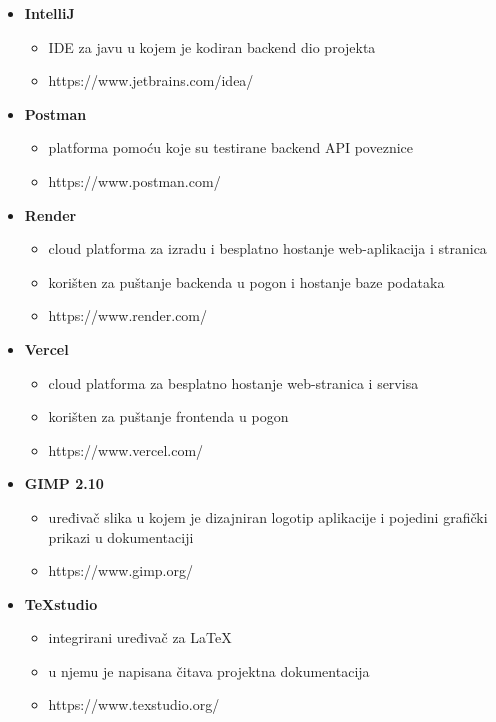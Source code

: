 \begin{itemize}
				\item \textbf{IntelliJ}
				\begin{itemize}
					\item IDE za javu u kojem je kodiran backend dio projekta
					\item https://www.jetbrains.com/idea/
				\end{itemize}
			
				\item \textbf{Postman}
				\begin{itemize}
					\item platforma pomoću koje su testirane backend API poveznice
					\item https://www.postman.com/
				\end{itemize}
			
				\item \textbf{Render}
				\begin{itemize}
					\item cloud platforma za izradu i besplatno hostanje web-aplikacija i stranica
					\item korišten za puštanje backenda u pogon i hostanje baze podataka
					\item https://www.render.com/
				\end{itemize}
				
				\item \textbf{Vercel}
				\begin{itemize}
					\item cloud platforma za besplatno hostanje web-stranica i servisa
					\item korišten za puštanje frontenda u pogon
					\item https://www.vercel.com/
				\end{itemize}
			
				\item \textbf{GIMP 2.10}
				\begin{itemize}
					\item uređivač slika u kojem je dizajniran logotip aplikacije i pojedini grafički prikazi u dokumentaciji
					\item https://www.gimp.org/
				\end{itemize}	
			
				\item \textbf{TeXstudio}
				\begin{itemize}
					\item integrirani uređivač za LaTeX
					\item u njemu je napisana čitava projektna dokumentacija
					\item https://www.texstudio.org/
				\end{itemize}
			

\end{itemize}
